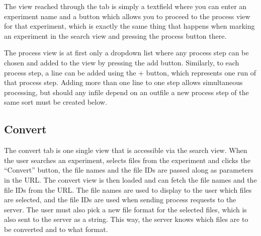 The view reached through the tab is simply a textfield where you can enter an
experiment name and a button which allows you to proceed to the process view
for that experiment, which is exactly the same thing that happens when marking
an experiment in the search view and pressing the process button there.

The process view is at first only a dropdown list where any process step can
be chosen and added to the view by pressing the add button. Similarly, to each 
process step, a line can be added using the + button, which represents one run
of that process step. Adding more than one line to one step allows simultaneous
processing, but should any infile depend on an outfile a new process step of the
same sort must be created below.

\subsection{Convert}

The convert tab is one single view that is accessible via the search view. When the user searches an experiment, selects files from the experiment and clicks the “Convert” button, the file names and the file IDs are passed along as parameters in the URL. The convert view is then loaded and can fetch the file names and the file IDs from the URL. The file names are used to display to the user which files are selected, and the file IDs are used when sending process requests to the server. The user must also pick a new file format for the selected files, which is also sent to the server as a string. This way, the server knows which files are to be converted and to what format.



